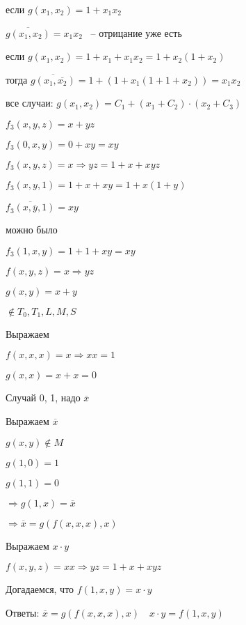 \documentclass[russian]{lecture-notes}
\begin{document}
    если $g(x_1, x_2) = 1 + x_1 x_2$

    $\overline{g(x_1, x_2)} = x_1 x_2$ ~-- отрицание уже есть

    если $g(x_1, x_2) = 1 + x_1 + x_1 x_2 = 1 + x_2(1 + x_2)$

    тогда $\overline{g(x_1, \overline{x_2})} = 1 + (1 + x_1(1 + 1 + x_2)) = x_1 x_2$

    все случаи: $g(x_1, x_2) = C_1 + (x_1 + C_2) \cdot (x_2 + C_3)$

    \begin{example}
        $f_3(x, y, z) = x + yz$

        $f_3(0, x, y) = 0 + xy = xy$
    \end{example}

    \begin{example}
        $f_3(x, y, z) = x \Rightarrow yz = 1 + x + xyz$

        $f_3(x, y, 1) = 1 + x + xy = 1 + x(1 + y)$

        $\overline{f_3(x, \overline{y}, 1)} = xy$

        можно было

        $f_3(1, x, y) = 1 + 1 + xy = xy$
    \end{example}

    \begin{example}
        $f(x, y, z) = x \Rightarrow yz$


        $g(x, y) = x + y$

        $\notin T_0, T_1, L, M, S$

        Выражаем

        $f(x, x, x) = x \Rightarrow xx = 1$

        $g(x, x) = x + x = 0$

        Случай 0, 1, надо $\overline{x}$

        Выражаем $\overline{x}$

        $g(x, y) \notin M$

        $g(1, 0) = 1$

        $g(1, 1) = 0$

        $\Rightarrow g(1, x) = \overline{x}$

        $\Rightarrow \overline{x} = g(f(x, x, x), x)$

        Выражаем $x \cdot y$

        $f(x, y, z) = xx \Rightarrow yz = 1 + x + xyz$

        Догадаемся, что $f(1, x, y) = x \cdot y$

        Ответы: $\overline{x} = g(f(x, x, x), x) \quad x \cdot y = f(1, x, y)$
    \end{example}
\end{document}
